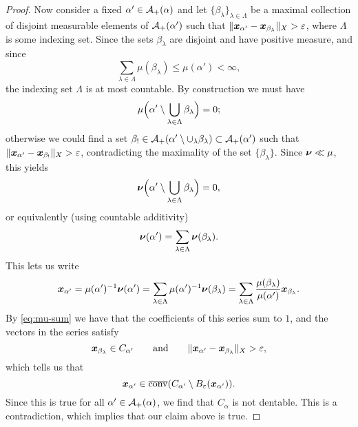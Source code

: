 \begin{proof}
  Now consider a fixed $\alpha' \in \mathcal{A}_{+}(\alpha)$ and let $\{\beta_{\lambda}\}_{\lambda \in \Lambda}$ be a maximal collection of disjoint measurable elements of $\mathcal{A}_+(\alpha')$ such that $\|\bm{x}_{\alpha'} - \bm{x}_{\beta_\lambda}\|_{X} > \varepsilon$, where $\Lambda$ is some indexing set.
  Since the sets $\beta_{\lambda}$ are disjoint and have positive measure, and since
  \begin{equation*}
    \sum_{\lambda \in \Lambda} \mu(\beta_{\lambda}) \leq \mu(\alpha') < \infty,
  \end{equation*}
  the indexing set $\Lambda$ is at most countable.
  By construction we must have
  \begin{equation}\label{eq:mu-sum}
    \mu\Big(\alpha' \setminus \bigcup_{\lambda \in \Lambda} \beta_\lambda\Big) = 0;
  \end{equation}
  otherwise we could find a set $\beta_{!} \in \mathcal{A}_{+}(\alpha' \setminus \cup_{\lambda} \beta_{\lambda}) \subset \mathcal{A}_{+}(\alpha')$ such that $\|\bm{x}_{\alpha'} - \bm{x}_{\beta_{!}}\|_{X} > \varepsilon$, contradicting the maximality of the set $
  \{\beta_{\lambda}\}$.
  Since $\bm{\nu} \ll \mu$, this yields
  \begin{equation*}
    \bm{\nu}\Big(\alpha' \setminus \bigcup_{\lambda \in \Lambda} \beta_\lambda\Big) = 0,
  \end{equation*}
  or equivalently (using countable additivity)
  \begin{equation*}
    \bm{\nu}(\alpha') = \sum_{\lambda \in \Lambda} \bm{\nu}(\beta_\lambda).
  \end{equation*}
  This lets us write
  \begin{equation*}
      \bm{x}_{\alpha'}
      = \mu(\alpha')^{-1}\bm{\nu}(\alpha') 
      = \sum_{\lambda \in \Lambda} \mu(\alpha')^{-1}\bm{\nu}(\beta_\lambda) 
      = \sum_{\lambda \in \Lambda} \frac{\mu(\beta_\lambda)}{\mu(\alpha')} \bm{x}_{\beta_\lambda}.
  \end{equation*}
  By \eqref{eq:mu-sum} we have that the coefficients of this series sum to $1$, and the vectors in the series satisfy
  \begin{equation*}
    \bm{x}_{\beta_{\lambda}} \in C_{\alpha'} \qquad \text{and} \qquad \| \bm{x}_{\alpha'}- \bm{x}_{\beta_\lambda} \|_X > \varepsilon,
  \end{equation*}
  which tells us that
  \begin{equation*}
    \bm{x}_{\alpha'} \in \overline{\mathrm{conv}}(C_{\alpha'} \setminus B_{\varepsilon}(\bm{x}_{\alpha'})).
  \end{equation*}
  Since this is true for all $\alpha' \in \mathcal{A}_{+}(\alpha)$, we find that $C_{\alpha}$ is not dentable.
  This is a contradiction, which implies that our claim above is true.


\end{proof}
